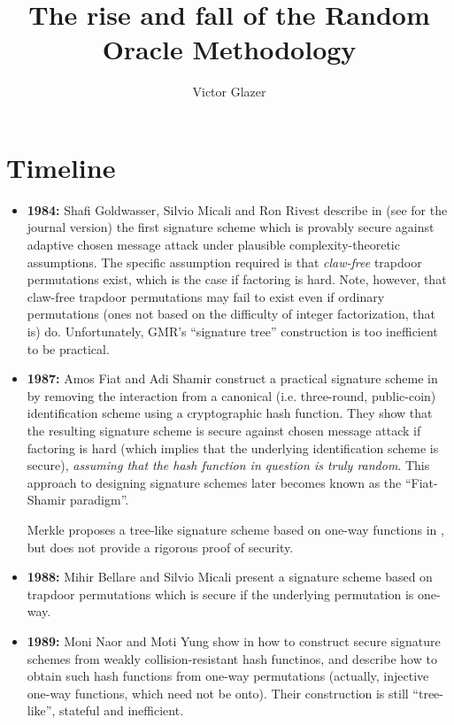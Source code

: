 \documentclass[12pt,twoside]{article}
\title{The rise and fall of the Random Oracle Methodology}
\author{Victor Glazer}
\theoremstyle{plain}
\begin{document}
\maketitle
\section*{Timeline}

\begin{itemize}
\item {\bf 1984:} Shafi Goldwasser, Silvio Micali and Ron Rivest describe in
\cite{goldwasser:signatures1} (see \cite{goldwasser:signatures2} for the
journal version) the first signature scheme which is provably secure against 
adaptive chosen message attack under plausible complexity-theoretic 
assumptions. The specific assumption required is that \emph{claw-free} 
trapdoor permutations exist, which is the case if factoring is hard. Note, however, that
claw-free trapdoor permutations may fail to exist even if ordinary
permutations (ones not based on the difficulty of integer factorization, that
is) do. Unfortunately, GMR's ``signature tree'' construction is too
inefficient to be practical.

\item {\bf 1987:} Amos Fiat and Adi Shamir construct a practical signature scheme in \cite{fiat:fsparadigm}
by removing the interaction from a canonical (i.e. three-round, public-coin) identification scheme
using a cryptographic hash function. They show that the resulting signature
scheme is secure against chosen message attack if factoring is hard (which
implies that the underlying identification scheme is secure), 
{\it assuming that the hash function in question is truly random}. This
approach to designing signature schemes later becomes known as the
``Fiat-Shamir paradigm''.

Merkle proposes a tree-like signature scheme based on one-way functions in
\cite{merkle:signatures}, but does not provide a rigorous proof of security.

\item {\bf 1988:} Mihir Bellare and Silvio Micali present a signature scheme
based on trapdoor permutations which is secure if the underlying permutation is
one-way.

\item {\bf 1989:} Moni Naor and Moti Yung show in \cite{naor:signatures} how 
to construct secure signature schemes from weakly collision-resistant hash
functinos, and describe how to obtain such hash functions from one-way
permutations (actually, injective one-way functions, which need not be onto).
Their construction is still ``tree-like'', stateful and inefficient.


\end{itemize}
\end{document}
